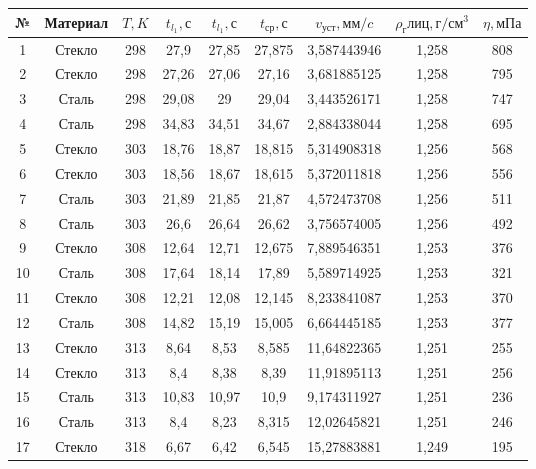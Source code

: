 \documentclass[a4paper, 12pt]{article}
\begin{document}
    \begin{table}[!ht]
        \centering
        \begin{tabular}{|c|c|c|c|c|c|c|c|c|}
        \hline
            № & Материал & $T, K$ & $t_{l_1}, с$& $t_{l_1}, с$ & $t_{ср}, с$ & $v_{уст}, мм/c$ & $\rho_глиц, г/см^3$ & $\eta, мПа$  \\ \hline
            1 & Стекло & 298 & 27,9 & 27,85 & 27,875 & 3,587443946 & 1,258  & 808  \\ \hline
            2 & Стекло & 298 & 27,26 & 27,06 & 27,16 & 3,681885125 & 1,258  & 795  \\ \hline
            3 & Сталь & 298 & 29,08 & 29 & 29,04 & 3,443526171 & 1,258  & 747  \\ \hline
            4 & Сталь & 298 & 34,83 & 34,51 & 34,67 & 2,884338044 & 1,258  & 695  \\ \hline
            5 & Стекло & 303 & 18,76 & 18,87 & 18,815 & 5,314908318 & 1,256  & 568  \\ \hline
            6 & Стекло & 303 & 18,56 & 18,67 & 18,615 & 5,372011818 & 1,256  & 556  \\ \hline
            7 & Сталь & 303 & 21,89 & 21,85 & 21,87 & 4,572473708 & 1,256  & 511  \\ \hline
            8 & Сталь & 303 & 26,6 & 26,64 & 26,62 & 3,756574005 & 1,256  & 492  \\ \hline
            9 & Стекло & 308 & 12,64 & 12,71 & 12,675 & 7,889546351 & 1,253  & 376  \\ \hline
            10 & Сталь & 308 & 17,64 & 18,14 & 17,89 & 5,589714925 & 1,253  & 321  \\ \hline
            11 & Стекло & 308 & 12,21 & 12,08 & 12,145 & 8,233841087 & 1,253  & 370  \\ \hline
            12 & Сталь & 308 & 14,82 & 15,19 & 15,005 & 6,664445185 & 1,253  & 377  \\ \hline
            13 & Стекло & 313 & 8,64 & 8,53 & 8,585 & 11,64822365 & 1,251  & 255  \\ \hline
            14 & Стекло & 313 & 8,4 & 8,38 & 8,39 & 11,91895113 & 1,251  & 256  \\ \hline
            15 & Сталь & 313 & 10,83 & 10,97 & 10,9 & 9,174311927 & 1,251  & 236  \\ \hline
            16 & Сталь & 313 & 8,4 & 8,23 & 8,315 & 12,02645821 & 1,251  & 246  \\ \hline
            17 & Стекло & 318 & 6,67 & 6,42 & 6,545 & 15,27883881 & 1,249  & 195  \\ \hline

\end{tabular}
\end{table}
\end{document}
